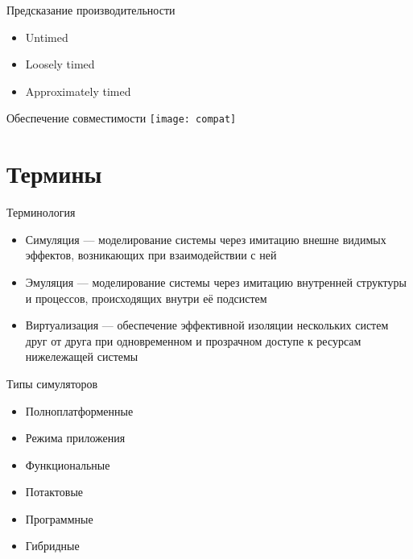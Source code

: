 \begin{frame}{Предсказание производительности}

\begin{itemize}
\item Untimed
\item Loosely timed
\item Approximately timed
\end{itemize}

\end{frame}


\begin{frame}{Обеспечение совместимости}
\texttt{[image: compat]} %

\end{frame}

\section{Термины}

\begin{frame}{Терминология}
\begin{itemize}
\item Симуляция — моделирование системы через имитацию внешне видимых эффектов, возникающих при взаимодействии с ней
\item Эмуляция — моделирование системы через имитацию внутренней структуры и процессов, происходящих внутри её подсистем
\item Виртуализация — обеспечение эффективной изоляции нескольких систем друг от друга при одновременном и прозрачном доступе к ресурсам нижележащей системы
\end{itemize}

\end{frame}

\begin{frame}{Типы симуляторов}
\begin{itemize}
\item Полноплатформенные
\item Режима приложения
\item Функциональные
\item Потактовые
\item Программные
\item Гибридные
\end{itemize}
\end{frame}

